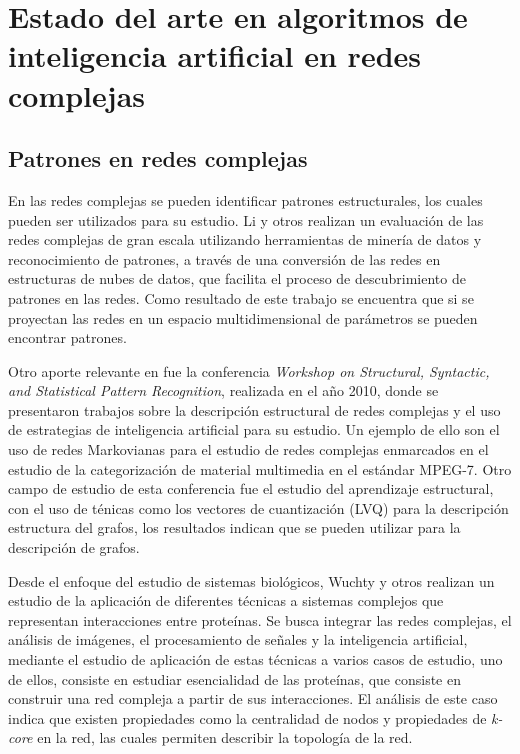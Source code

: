 \section{Estado del arte en algoritmos de inteligencia artificial en redes complejas}


\subsection{Patrones en redes complejas}

En las redes complejas se pueden identificar patrones estructurales, los cuales pueden ser
utilizados para su estudio. Li y otros\cite{Li2012IA} realizan un evaluación de las redes complejas de gran escala utilizando herramientas de minería de datos y reconocimiento de patrones, a través de una conversión de las redes en estructuras de nubes de datos, que facilita el proceso de descubrimiento de patrones en las redes. Como resultado de este trabajo se encuentra que si se proyectan las redes en un espacio multidimensional de parámetros se pueden encontrar patrones.

Otro aporte relevante en fue la conferencia \textit{Workshop on Structural, Syntactic, and Statistical Pattern Recognition}\cite{Jain2000}, realizada
en el año 2010, donde se presentaron trabajos sobre la descripción estructural de redes complejas y el uso de estrategias de inteligencia artificial para su estudio. Un ejemplo de ello son el uso de redes Markovianas para el estudio de redes complejas enmarcados en el estudio de la categorización de material multimedia en el estándar MPEG-7. Otro campo de estudio de esta conferencia fue el estudio del aprendizaje estructural, con el uso de ténicas como los vectores de cuantización (LVQ) para la descripción estructura del grafos, los resultados indican que se
pueden utilizar para la descripción de grafos.


Desde el enfoque del estudio de sistemas biológicos, Wuchty y otros\cite{Wuchty2005} realizan un estudio de la aplicación de diferentes técnicas a sistemas complejos que representan interacciones entre proteínas. Se busca integrar las redes complejas, el análisis de imágenes, el procesamiento de señales y la inteligencia artificial, mediante el estudio de aplicación de estas técnicas a varios casos de estudio, uno de ellos, consiste en estudiar esencialidad de las proteínas, que consiste en construir una red compleja a partir de sus interacciones. El análisis de este caso indica que existen propiedades como
la centralidad de nodos y propiedades de \textit{k-core} en la red, las cuales permiten describir la topología de la red.

